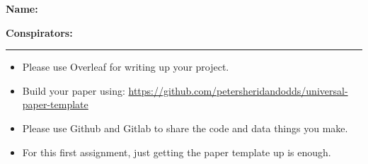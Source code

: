 \textbf{Name:} \\

\medskip

\textbf{Conspirators:} 

\medskip
\medskip

\hrule

\medskip


\assignmentsonly{\pleasesubmitprojectdraft}

\begin{itemize}
\item 
  Please use Overleaf for writing up your project.
\item
  Build your paper using:
  \url{https://github.com/petersheridandodds/universal-paper-template}
\item
  Please use Github and Gitlab to share the code and data things you make.
\item
  For this first assignment, just getting the paper template up is enough.
\end{itemize}

